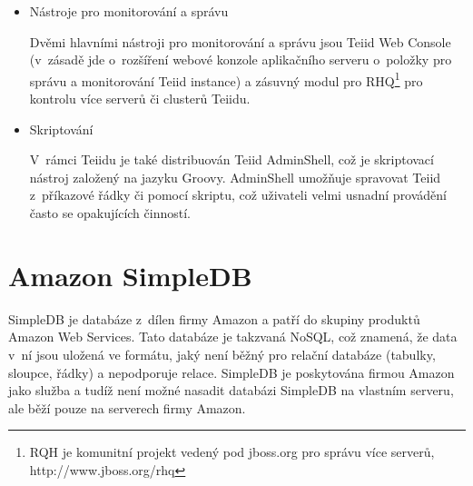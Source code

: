 \documentclass[oneside,12pt,final]{fithesis2}
\begin{document}
\begin{itemize}
\begin{itemize}
  \item Nástroje pro monitorování a správu
  
  Dvěmi hlavními nástroji pro monitorování a správu jsou Teiid Web Console (v~zásadě jde o~rozšíření webové konzole aplikačního serveru o~položky pro správu a monitorování Teiid instance) a zásuvný modul pro RHQ\footnote{RQH je komunitní projekt vedený pod jboss.org pro správu více serverů, http://www.jboss.org/rhq} pro kontrolu více serverů či clusterů Teiidu.
  
  \item Skriptování
  
  V~rámci Teiidu je také distribuován Teiid AdminShell, což je skriptovací nástroj založený na jazyku Groovy. AdminShell umožňuje spravovat Teiid z~příkazové řádky či pomocí skriptu, což uživateli velmi usnadní provádění často se opakujících činností.
  
  \end{itemize}

\end{itemize}

\chapter{Amazon SimpleDB}
SimpleDB je databáze z~dílen firmy Amazon a patří do skupiny produktů Amazon Web Services. Tato databáze je takzvaná NoSQL, což znamená, že data v~ní jsou uložená ve formátu, jaký není běžný pro relační databáze (tabulky, sloupce, řádky) a nepodporuje relace. SimpleDB je poskytována firmou Amazon jako služba a tudíž není možné nasadit databázi SimpleDB na vlastním serveru, ale běží pouze na serverech firmy Amazon. 
\end{document}
